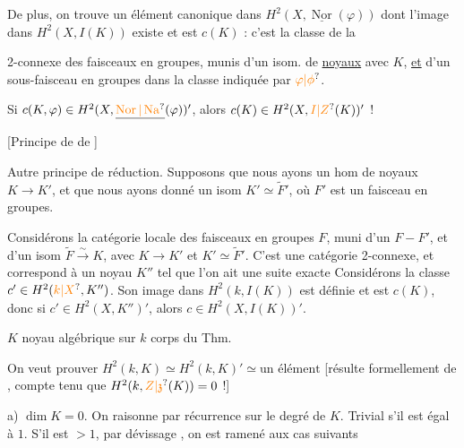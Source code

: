  De plus, on trouve un élément canonique dans $H^2(X,\underline{\operatorname{Nor}}(\varphi))$ dont l'image dans $H^2(X,I(K))$ existe et est $c(K)$ :  c'est la classe de la 

2-connexe des faisceaux en groupes, munis d'un isom. de \uline{noyaux} avec $K$, \uline{et} d'un sous-faisceau en groupes dans la classe indiquée par $\unsure{\varphi|\phi}$.

Si $c(K,\varphi)\in H^2(X,\underline{\unsure{\operatorname{Nor}|\operatorname{Na}}}(\varphi))'$, alors $c(K)\in H^2(X,\unsure{I|Z}(K))'$ !

[Principe de  de ]

Autre principe de réduction. Supposons que nous ayons un hom  de noyaux $K\longrightarrow K'$, et que nous ayons donné un isom $K'\simeq\widetilde{F}'$, où $F'$ est un faisceau en groupes.

 Considérons la catégorie locale des faisceaux en groupes $F$, muni d'un  $F-F'$, et d'un isom $\widetilde{F}\xrightarrow{\sim}K$,  avec $K\longrightarrow K'$ et $K'\simeq\widetilde{F}'$. C'est une catégorie 2-connexe, et correspond à un noyau $K''$ tel que l'on ait une suite exacte
 Considérons la classe $c'\in H^2(\unsure{k|X},K'')$. Son image dans  $H^2(k,I(K))$ est définie et est $c(K)$, donc si $c'\in H^2(X,K'')'$, alors $c\in H^2(X,I(K))'$.


$K$ noyau algébrique sur $k$ corps du Thm.

On veut prouver $H^2(k,K)\simeq H^2(k,K)'\simeq\text{un élément}$ [résulte formellement de , compte tenu que $H^2(k,\unsure{Z|\mathfrak{z}}(K))=0$ !] 

a) $\dim K=0$. On raisonne par récurrence sur le degré de $K$. Trivial s'il est égal à $1$. S'il est $>1$, par dévissage , on est ramené aux cas suivants


